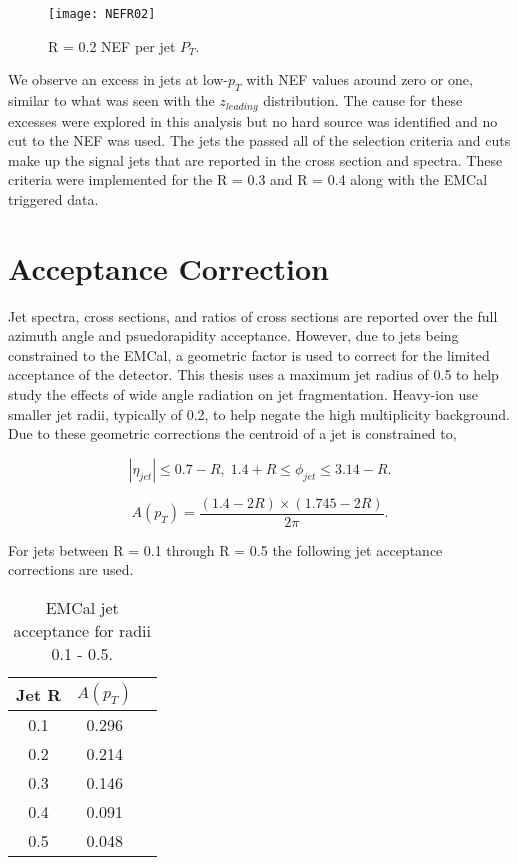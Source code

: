 \begin{figure}[h]
\texttt{[image: NEFR02]}
\centering
\caption{R = 0.2 NEF per jet $P_{T}$.}
\label{fig:JetNEF}
\end{figure}
\noindent
We observe an excess in jets at low-$p_{T}$ with NEF values around zero or one, similar to what was seen with the $z_{leading}$ distribution.  The cause for these excesses were explored in this analysis but no hard source was identified and no cut to the NEF was used.
The jets the passed all of the selection criteria and cuts make up the signal jets that are reported in the cross section and spectra.  These criteria were implemented for the R = 0.3 and R = 0.4 along with the EMCal triggered data.




\section{Acceptance Correction}
Jet spectra, cross sections, and ratios of cross sections are reported over the full azimuth angle and psuedorapidity acceptance.  However, due to jets being constrained to the EMCal, a geometric factor is used to correct for the limited acceptance of the detector.  This thesis uses a maximum jet radius of 0.5 to help study the effects of wide angle radiation on jet fragmentation.  Heavy-ion use smaller jet radii, typically of 0.2, to help negate the high multiplicity background.  Due to these geometric corrections the centroid of a jet is constrained to,

\begin{equation}
|\eta_{jet}| \leq 0.7 - R, \; 1.4 + R \leq \phi_{jet} \leq 3.14 -R.
\label{eq:jetconstration}
\end{equation}

\begin{equation}
A(p_{T}) = \frac{(1.4 - 2R) \times (1.745 - 2R)}{2 \pi}.
\label{eq:acceptance}
\end{equation}

For jets between R = 0.1 through R = 0.5 the following jet acceptance corrections are used.

\begin{table}[hb]
\label{tab:AcceptanceFactor}
\begin{center}
\begin{tabular}[b]{|c|c|c|}
	\hline
	Jet R & $A(p_{T})$ \\ \hline
	0.1 & 0.296 \\ \hline
	0.2 & 0.214\\ \hline
	0.3 & 0.146\\ \hline
	0.4 & 0.091\\ \hline
	0.5 & 0.048\\ \hline
\end{tabular}
\end{center}
\caption{EMCal jet acceptance for radii 0.1 - 0.5.}
\end{table}



